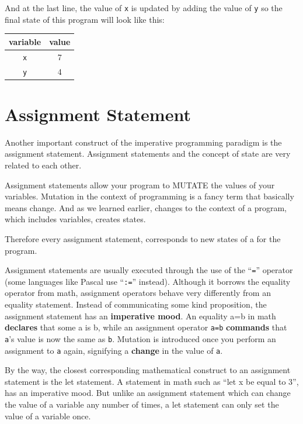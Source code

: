 And at the last line, the value of \texttt{x} is updated by adding the
value of \texttt{y} so the final state of this program will look like
this:

\begin{longtable}[]{@{}cc@{}}
\toprule\noalign{}
variable & value \\
\midrule\noalign{}
\endhead
\bottomrule\noalign{}
\endlastfoot
\texttt{x} & 7 \\
\texttt{y} & 4 \\
\end{longtable}

\section{Assignment
Statement}\label{imperative-programming.md__assignment-statement}

Another important construct of the imperative programming paradigm is
the assignment statement. Assignment statements and the concept of state
are very related to each other.

Assignment statements allow your program to MUTATE the values of your
variables. Mutation in the context of programming is a fancy term that
basically means change. And as we learned earlier, changes to the
context of a program, which includes variables, creates states.

Therefore every assignment statement, corresponds to new states of a for
the program.

Assignment statements are usually executed through the use of the
``\texttt{=}'' operator (some languages like Pascal use ``\texttt{:=}''
instead). Although it borrows the equality operator from math,
assignment operators behave very differently from an equality statement.
Instead of communicating some kind proposition, the assignment statement
has an \textbf{imperative mood}. An equality a=b in math
\textbf{declares} that some a is b, while an assignment operator
\texttt{a=b} \textbf{commands} that \texttt{a}'s value is now the same
as \texttt{b}. Mutation is introduced once you perform an assignment to
\texttt{a} again, signifying a \textbf{change} in the value of
\texttt{a}.

By the way, the closest corresponding mathematical construct to an
assignment statement is the let statement. A statement in math such as
``let x be equal to 3'', has an imperative mood. But unlike an
assignment statement which can change the value of a variable any number
of times, a let statement can only set the value of a variable once.

